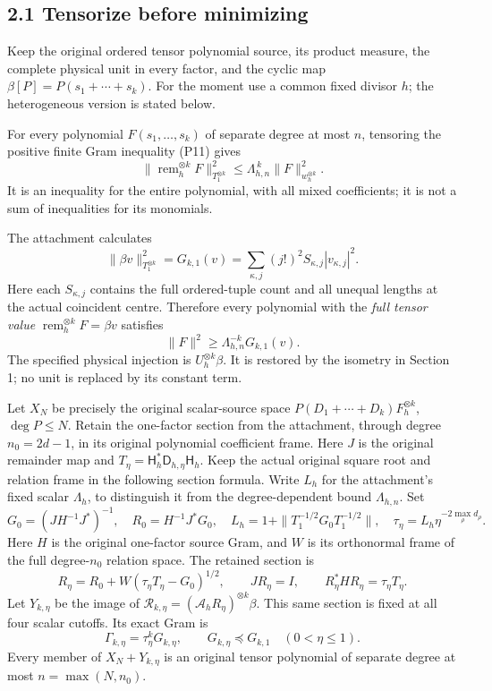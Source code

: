 \subsection{2.1 Tensorize before minimizing}\label{tensorize-before-minimizing}

Keep the original ordered tensor polynomial source, its product measure, the complete physical unit in every factor, and the cyclic map \(\beta[P]=P(s_1+\cdots+s_k)\). For the moment use a common fixed divisor \(h\); the heterogeneous version is stated below.

For every polynomial \(F(s_1,\ldots,s_k)\) of separate degree at most \(n\), tensoring the positive finite Gram inequality (P11) gives \[
 \|\operatorname{rem}_h^{\otimes k}F\|_{T_1^{\otimes k}}^2
 \le\Lambda_{h,n}^{\,k}\|F\|_{w_h^{\otimes k}}^2. \tag{J1}
\] It is an inequality for the entire polynomial, with all mixed coefficients; it is not a sum of inequalities for its monomials.

The attachment calculates \[
 \|\beta v\|_{T_1^{\otimes k}}^2=G_{k,1}(v)
 =\sum_{\kappa,j}(j!)^2S_{\kappa,j}|v_{\kappa,j}|^2.
\] Here each \(S_{\kappa,j}\) contains the full ordered-tuple count and all unequal lengths at the actual coincident centre. Therefore every polynomial with the \emph{full tensor value} \(\operatorname{rem}_h^{\otimes k}F=\beta v\) satisfies \[
 \boxed{\|F\|^2\ge\Lambda_{h,n}^{-k}G_{k,1}(v).} \tag{J2}
\] The specified physical injection is \(U_h^{\otimes k}\beta\). It is restored by the isometry in Section 1; no unit is replaced by its constant term.

Let \(X_N\) be precisely the original scalar-source space \(P(D_1+\cdots+D_k)F_h^{\otimes k}\), \(\deg P\le N\). Retain the one-factor section from the attachment, through degree \(n_0=2d-1\), in its original polynomial coefficient frame. Here \(J\) is the original remainder map and \(T_\eta=\mathsf H_h^*\mathsf D_{h,\eta}\mathsf H_h\). Keep the actual original square root and relation frame in the following section formula. Write \(L_h\) for the attachment's fixed scalar \(\Lambda_h\), to distinguish it from the degree-dependent bound \(\Lambda_{h,n}\). Set \[
 G_0=(JH^{-1}J^*)^{-1},\quad
 R_0=H^{-1}J^*G_0,\quad
 L_h=1+\|T_1^{-1/2}G_0T_1^{-1/2}\|,\quad
 \tau_\eta=L_h\eta^{-2\max_\rho d_\rho}.
\] Here \(H\) is the original one-factor source Gram, and \(W\) is its orthonormal frame of the full degree-\(n_0\) relation space. The retained section is \[
 R_\eta=R_0+W(\tau_\eta T_\eta-G_0)^{1/2},\qquad
 JR_\eta=I,\qquad R_\eta^*HR_\eta=\tau_\eta T_\eta.
\] Let \(Y_{k,\eta}\) be the image of \(\mathcal R_{k,\eta}=(\mathcal A_hR_\eta)^{\otimes k}\beta\). This same section is fixed at all four scalar cutoffs. Its exact Gram is \[
 \Gamma_{k,\eta}=\tau_\eta^kG_{k,\eta},\qquad
 G_{k,\eta}\preceq G_{k,1}\quad(0<\eta\le1).
\] Every member of \(X_N+Y_{k,\eta}\) is an original tensor polynomial of separate degree at most \(n=\max(N,n_0)\).


